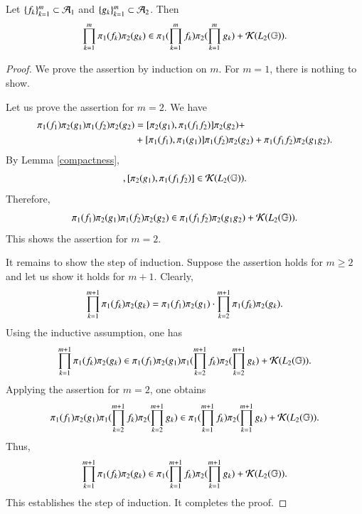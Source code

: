 \documentclass[leqno]{amsart}
\begin{document}
	\begin{lemma}\label{productcontain}
		Let $\{f_{k}\}_{k=1}^{m}\subset{\mathcal A}_{1}$ and $\{g_{k}\}_{k=1}^{m}\subset{\mathcal A}_{2}$. Then
		\begin{align*}
			\prod_{k=1}^{m}\pi_{1}(f_{k})\pi_{2}(g_{k})\in\pi_{1}(\prod_{k=1}^{m}f_{k})\pi_{2}(\prod_{k=1}^{m}g_{k})+{\mathcal K}(L_{2}(\mathbb{G})).
		\end{align*}
	\end{lemma}
	\begin{proof}
		We prove the assertion by induction on $m$. For $m=1$, there is nothing to show. %
		
		Let us prove the assertion for $m=2$. 
		We have
		\begin{align*}
			\pi_{1}(f_{1})\pi_{2}(g_{1})\pi_{1}(f_{2})\pi_{2}(g_{2})
			&=[\pi_{2}(g_{1}),\pi_{1}(f_{1}f_{2})]\pi_{2}(g_{2})+\\
			&+[\pi_{1}(f_{1}),\pi_{1}(g_{1})]\pi_{1}(f_{2})\pi_{2}(g_{2})+\pi_{1}(f_{1}f_{2})\pi_{2}(g_{1}g_{2}).
		\end{align*}
		By Lemma \ref{compactness},
		\begin{align*}
			[\po(f_{1}),\po(g_{1})],[\pt(g_{1}),\po(f_{1}f_{2})]\in\K(\lp{2}).
		\end{align*}
		Therefore,
		\begin{align*}
			\pi_{1}(f_{1})\pi_{2}(g_{1})\pi_{1}(f_{2})\pi_{2}(g_{2})\in \pi_{1}(f_{1}f_{2})\pi_{2}(g_{1}g_{2})+{\mathcal K}(L_{2}(\mathbb{G})).
		\end{align*}
		This shows the assertion for $m=2$.
		
		It remains to show the step of induction. Suppose the assertion holds for $m\geq2$ and let us show it holds for $m+1$.
		Clearly,
		\begin{align*}
			\prod_{k=1}^{m+1}\pi_{1}(f_{k})\pi_{2}(g_{k})=\pi_{1}(f_{1})\pi_{2}(g_{1})\cdot \prod_{k=2}^{m+1}\pi_{1}(f_{k})\pi_{2}(g_{k}).
		\end{align*}
		Using the inductive assumption, one has
		\begin{align*}
			\prod_{k=1}^{m+1}\pi_{1}(f_{k})\pi_{2}(g_{k})
			\in \pi_{1}(f_{1})\pi_{2}(g_{1})\pi_{1}(\prod_{k=2}^{m+1}f_{k})\pi_{2}(\prod_{k=2}^{m+1}g_{k})+{\mathcal K}(L_{2}(\mathbb{G})).
		\end{align*}
		Applying the assertion for $m=2$, one obtains
		\begin{align*}
			\pi_{1}(f_{1})\pi_{2}(g_{1})\pi_{1}(\prod_{k=2}^{m+1}f_{k})\pi_{2}(\prod_{k=2}^{m+1}g_{k})
			\in \pi_{1}(\prod_{k=1}^{m+1}f_{k})\pi_{2}(\prod_{k=1}^{m+1}g_{k})+{\mathcal K}(L_{2}(\mathbb{G})).
		\end{align*}
		Thus,
		\begin{align*}
			\prod_{k=1}^{m+1}\pi_{1}(f_{k})\pi_{2}(g_{k})\in \pi_{1}(\prod_{k=1}^{m+1}f_{k})\pi_{2}(\prod_{k=1}^{m+1}g_{k})+{\mathcal K}(L_{2}(\mathbb{G})).
		\end{align*}
		This establishes the step of induction. It completes the proof.
	\end{proof}
	
\end{document}

